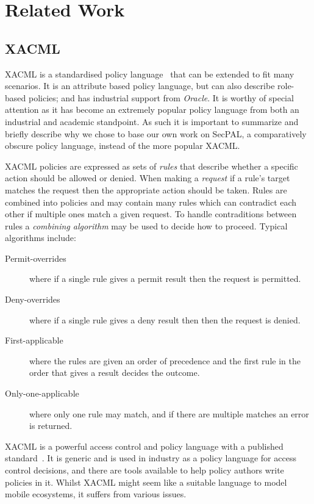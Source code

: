 \documentclass[thesis.tex]{subfiles}
\begin{document}
    \chapter{Related Work}
    \label{chap:related-work}

\section{XACML}

XACML is a standardised policy language~\cite{oasis_extensible_2013}
that can be extended to fit many scenarios. It is an attribute based
policy language, but can also describe role-based policies; and has
industrial support from \emph{Oracle}.  It is worthy of special
attention as it has become an extremely popular policy language from
both an industrial and academic standpoint.  As such it is important
to summarize and briefly describe why we chose to base our own work on
SecPAL, a comparatively obscure policy language, instead of the more
popular XACML.

XACML policies are expressed as sets of \emph{rules} that describe
whether a specific action should be allowed or denied. When making a
\emph{request} if a rule's target matches the request then the
appropriate action should be taken. Rules are combined into policies
and may contain many rules which can contradict each other if multiple
ones match a given request. To handle contraditions between rules a
\emph{combining algorithm} may be used to decide how to
proceed. Typical algorithms include:

\begin{description}
  \item[Permit-overrides] where if a single rule gives a permit result then the request is permitted.
  \item[Deny-overrides] where if a single rule gives a deny result then then the request is denied.
  \item[First-applicable] where the rules are given an order of precedence and the first rule in the order that gives a result decides the outcome.
  \item[Only-one-applicable] where only one rule may match, and if there are multiple matches an error is returned.
\end{description}

XACML is a powerful access control and policy language with a published
standard~\cite{oasis_extensible_2013}. It is generic and is used in industry as
a policy language for access control decisions, and there are tools available to
help policy authors write policies in it. Whilst XACML might seem like a
suitable language to model mobile ecosystems, it suffers from various issues.
\end{document}
